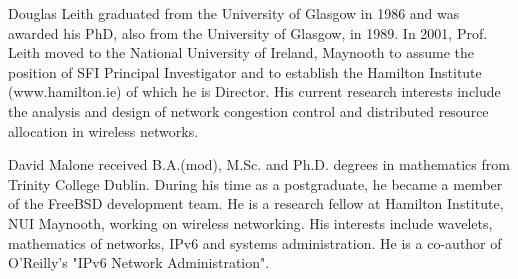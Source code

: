 \documentclass[10pt,twocolumn, journal]{IEEEtran}
\begin{document}
\begin{IEEEbiography}{Douglas Leith}
graduated from the University of Glasgow in 1986 and was awarded his PhD, also from the
University of Glasgow, in 1989. In 2001, Prof. Leith moved to the National University of
Ireland, Maynooth to assume the position of SFI Principal Investigator and to establish
the Hamilton Institute (www.hamilton.ie) of which he is Director.  His current research
interests  include the analysis and design of network congestion control and distributed
resource allocation in wireless networks.
\end{IEEEbiography}



\begin{IEEEbiography}{David Malone}
received B.A.(mod), M.Sc. and Ph.D. degrees in mathematics from Trinity College Dublin.
During his time as a postgraduate, he became a member of the FreeBSD development team. He
is a research fellow at Hamilton Institute, NUI Maynooth, working on wireless networking.
His interests include wavelets, mathematics of networks, IPv6 and systems administration.
He is a co-author of O'Reilly's "IPv6 Network Administration".
\end{IEEEbiography}
\end{document}
